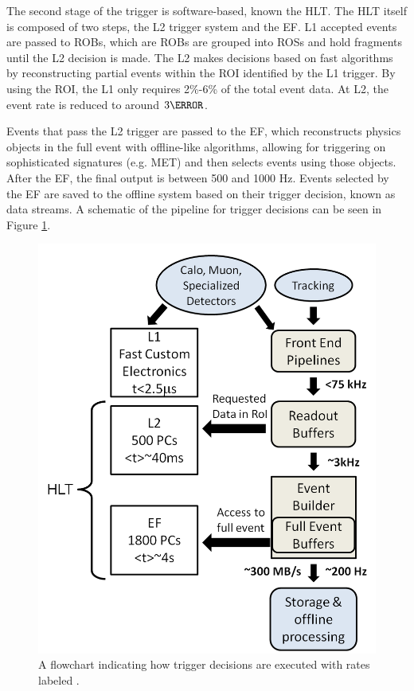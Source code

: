 The second stage of the trigger is software-based, known the \gls{HLT}. The \gls{HLT} itself is composed of two steps, the \gls{L2} trigger system and the \gls{EF}. \gls{L1} accepted events are passed to \glspl{ROB}, which are \glspl{ROB} are grouped into \glspl{ROS} and hold fragments until the \gls{L2} decision is made. The \gls{L2} makes decisions based on fast algorithms by reconstructing partial events within the \gls{ROI} identified by the \gls{L1} trigger. By using the \gls{ROI}, the \gls{L1} only requires 2\%-6\% of the total event data. At \gls{L2}, the event rate is reduced to around $\unit{3}{\kHz}$.

Events that pass the \gls{L2} trigger are passed to the \gls{EF}, which reconstructs physics objects in the full event with offline-like algorithms, allowing for triggering on sophisticated signatures (e.g. \gls{MET}) and then selects events using those objects. After the \gls{EF}, the final output is between 500 and 1000 Hz. Events selected by the \gls{EF} are saved to the offline system based on their trigger decision, known as data streams. A schematic of the pipeline for trigger decisions can be seen in Figure \ref{fig:trigger-schematic}.


\begin{figure}[!ht]
    \centering
    \includegraphics[width=.45\textwidth]{chapters/chapter2_experiment/images/trigger.png}
    \caption{A flowchart indicating how trigger decisions are executed with rates labeled \cite{trigger2010}.}
    \label{fig:trigger-schematic}
\end{figure}

